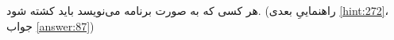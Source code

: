 \section{}
\paragraph{}\label{hint:37}
هر کسی که به صورت  برنامه می‌نویسد باید کشته شود. (راهنماییِ بعدی \ref{hint:272}، جواب \ref{answer:87})